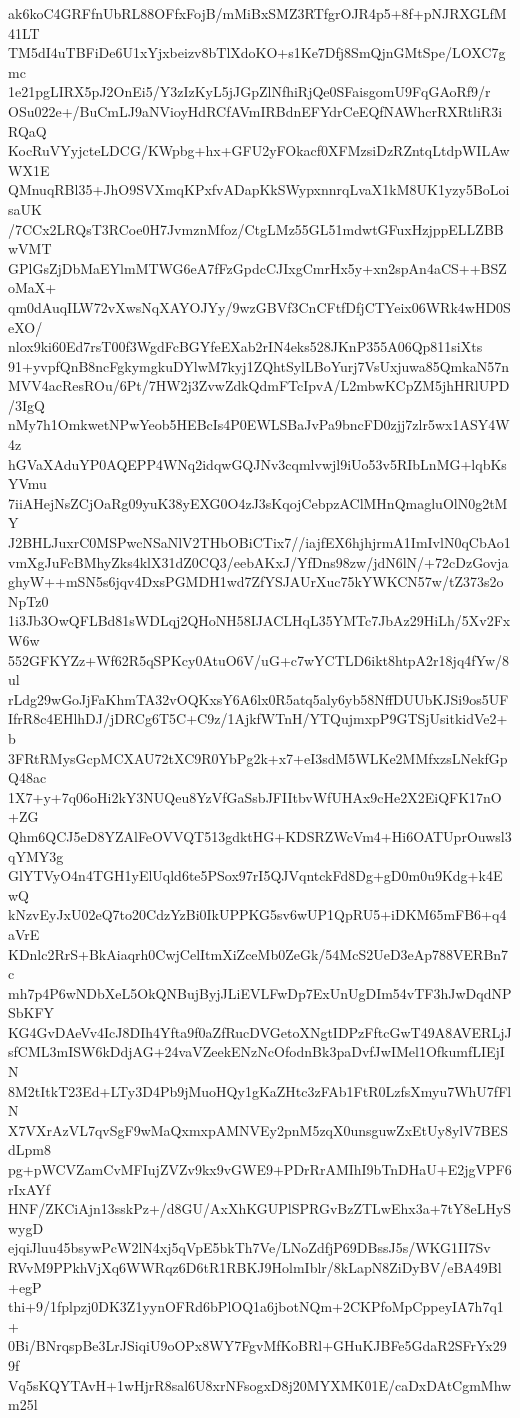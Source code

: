 ak6koC4GRFfnUbRL88OFfxFojB/mMiBxSMZ3RTfgrOJR4p5+8f+pNJRXGLfM41LT
TM5dI4uTBFiDe6U1xYjxbeizv8bTlXdoKO+s1Ke7Dfj8SmQjnGMtSpe/LOXC7gmc
1e21pgLIRX5pJ2OnEi5/Y3zIzKyL5jJGpZlNfhiRjQe0SFaisgomU9FqGAoRf9/r
OSu022e+/BuCmLJ9aNVioyHdRCfAVmIRBdnEFYdrCeEQfNAWhcrRXRtliR3iRQaQ
KocRuVYyjcteLDCG/KWpbg+hx+GFU2yFOkacf0XFMzsiDzRZntqLtdpWILAwWX1E
QMnuqRBl35+JhO9SVXmqKPxfvADapKkSWypxnnrqLvaX1kM8UK1yzy5BoLoisaUK
/7CCx2LRQsT3RCoe0H7JvmznMfoz/CtgLMz55GL51mdwtGFuxHzjppELLZBBwVMT
GPlGsZjDbMaEYlmMTWG6eA7fFzGpdcCJIxgCmrHx5y+xn2spAn4aCS++BSZoMaX+
qm0dAuqILW72vXwsNqXAYOJYy/9wzGBVf3CnCFtfDfjCTYeix06WRk4wHD0SeXO/
nlox9ki60Ed7rsT00f3WgdFcBGYfeEXab2rIN4eks528JKnP355A06Qp811siXts
91+yvpfQnB8ncFgkymgkuDYlwM7kyj1ZQhtSylLBoYurj7VsUxjuwa85QmkaN57n
MVV4acResROu/6Pt/7HW2j3ZvwZdkQdmFTcIpvA/L2mbwKCpZM5jhHRlUPD/3IgQ
nMy7h1OmkwetNPwYeob5HEBcIs4P0EWLSBaJvPa9bncFD0zjj7zlr5wx1ASY4W4z
hGVaXAduYP0AQEPP4WNq2idqwGQJNv3cqmlvwjl9iUo53v5RIbLnMG+lqbKsYVmu
7iiAHejNsZCjOaRg09yuK38yEXG0O4zJ3sKqojCebpzAClMHnQmagluOlN0g2tMY
J2BHLJuxrC0MSPwcNSaNlV2THbOBiCTix7//iajfEX6hjhjrmA1ImIvlN0qCbAo1
vmXgJuFcBMhyZks4klX31dZ0CQ3/eebAKxJ/YfDns98zw/jdN6lN/+72cDzGovja
ghyW++mSN5s6jqv4DxsPGMDH1wd7ZfYSJAUrXuc75kYWKCN57w/tZ373s2oNpTz0
1i3Jb3OwQFLBd81sWDLqj2QHoNH58IJACLHqL35YMTc7JbAz29HiLh/5Xv2FxW6w
552GFKYZz+Wf62R5qSPKcy0AtuO6V/uG+c7wYCTLD6ikt8htpA2r18jq4fYw/8ul
rLdg29wGoJjFaKhmTA32vOQKxsY6A6lx0R5atq5aly6yb58NffDUUbKJSi9os5UF
IfrR8c4EHlhDJ/jDRCg6T5C+C9z/1AjkfWTnH/YTQujmxpP9GTSjUsitkidVe2+b
3FRtRMysGcpMCXAU72tXC9R0YbPg2k+x7+eI3sdM5WLKe2MMfxzsLNekfGpQ48ac
1X7+y+7q06oHi2kY3NUQeu8YzVfGaSsbJFIItbvWfUHAx9cHe2X2EiQFK17nO+ZG
Qhm6QCJ5eD8YZAlFeOVVQT513gdktHG+KDSRZWcVm4+Hi6OATUprOuwsl3qYMY3g
GlYTVyO4n4TGH1yElUqld6te5PSox97rI5QJVqntckFd8Dg+gD0m0u9Kdg+k4EwQ
kNzvEyJxU02eQ7to20CdzYzBi0IkUPPKG5sv6wUP1QpRU5+iDKM65mFB6+q4aVrE
KDnlc2RrS+BkAiaqrh0CwjCelItmXiZceMb0ZeGk/54McS2UeD3eAp788VERBn7c
mh7p4P6wNDbXeL5OkQNBujByjJLiEVLFwDp7ExUnUgDIm54vTF3hJwDqdNPSbKFY
KG4GvDAeVv4IcJ8DIh4Yfta9f0aZfRucDVGetoXNgtIDPzFftcGwT49A8AVERLjJ
sfCML3mISW6kDdjAG+24vaVZeekENzNcOfodnBk3paDvfJwIMel1OfkumfLIEjIN
8M2tItkT23Ed+LTy3D4Pb9jMuoHQy1gKaZHtc3zFAb1FtR0LzfsXmyu7WhU7fFlN
X7VXrAzVL7qvSgF9wMaQxmxpAMNVEy2pnM5zqX0unsguwZxEtUy8ylV7BESdLpm8
pg+pWCVZamCvMFIujZVZv9kx9vGWE9+PDrRrAMIhI9bTnDHaU+E2jgVPF6rIxAYf
HNF/ZKCiAjn13sskPz+/d8GU/AxXhKGUPlSPRGvBzZTLwEhx3a+7tY8eLHySwygD
ejqiJluu45bsywPcW2lN4xj5qVpE5bkTh7Ve/LNoZdfjP69DBssJ5s/WKG1II7Sv
RVvM9PPkhVjXq6WWRqz6D6tR1RBKJ9HolmIblr/8kLapN8ZiDyBV/eBA49Bl+egP
thi+9/1fplpzj0DK3Z1yynOFRd6bPlOQ1a6jbotNQm+2CKPfoMpCppeyIA7h7q1+
0Bi/BNrqspBe3LrJSiqiU9oOPx8WY7FgvMfKoBRl+GHuKJBFe5GdaR2SFrYx299f
Vq5sKQYTAvH+1wHjrR8sal6U8xrNFsogxD8j20MYXMK01E/caDxDAtCgmMhwm25l

